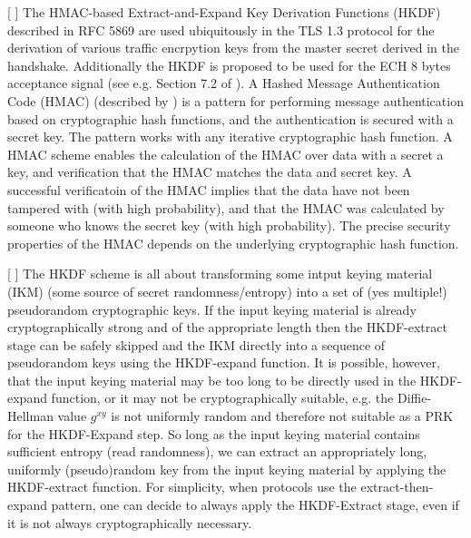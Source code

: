 [ ] The HMAC-based Extract-and-Expand Key Derivation Functions (HKDF) described in RFC 5869 are used ubiquitously in the TLS 1.3 protocol for the derivation of various traffic encrpytion keys from the master secret derived in the handshake. Additionally the HKDF is proposed to be used for the ECH  8 bytes acceptance signal (see e.g. Section 7.2 of \cite{esni}). A Hashed Message Authentication Code (HMAC) (described by \cite{rfc2104}) is a pattern for performing message authentication based on cryptographic hash functions, and the authentication is secured with a secret key. The pattern works with any iterative cryptographic hash function. A HMAC scheme enables the calculation of the HMAC over data with a secret a key, and verification that the HMAC matches the data and secret key. A successful verificatoin of the HMAC implies that the data have not been tampered with (with high probability), and that the HMAC was calculated by someone who knows the secret key (with high probability). The precise security properties of the HMAC depends on the underlying cryptographic hash function.

[ ] The HKDF scheme is all about transforming some intput keying material (IKM) (some source of secret randomness/entropy) into a set of (yes multiple!) pseudorandom cryptographic keys. If the input keying material is already cryptographically strong and of the appropriate length then the HKDF-extract stage can be safely skipped and the IKM directly into a sequence of pseudorandom keys using the HKDF-expand function. It is possible, however, that the input keying material may be too long to be directly used in the HKDF-expand function, or it may not be cryptographically suitable, e.g. the Diffie-Hellman value $g^{xy}$ is not uniformly random and therefore not suitable as a PRK for the HKDF-Expand step. So long as the input keying material contains sufficient entropy (read randomness), we can extract an appropriately long, uniformly (pseudo)random key from the input keying material by applying the HKDF-extract function. For simplicity, when protocols use the extract-then-expand pattern, one can decide to always apply the HKDF-Extract stage, even if it is not always cryptographically necessary.

